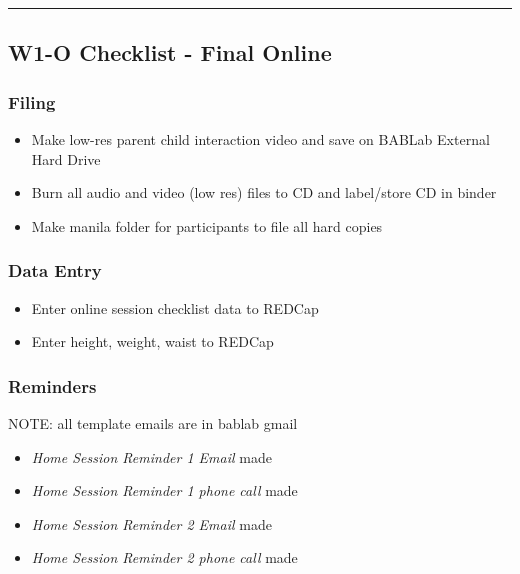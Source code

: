 \documentclass[
]{book}
\providecommand{\tightlist}{%
  \setlength{\itemsep}{0pt}\setlength{\parskip}{0pt}}
\begin{document}
\begin{center}\rule{0.5\linewidth}{0.5pt}\end{center}

\hypertarget{w1-o-checklist---final-online}{%
\subsection{W1-O Checklist - Final Online}\label{w1-o-checklist---final-online}}

\hypertarget{filing-3}{%
\subsubsection{Filing}\label{filing-3}}

\begin{itemize}
\tightlist
\item
  Make low-res parent child interaction video and save on BABLab External Hard Drive
\item
  Burn all audio and video (low res) files to CD and label/store CD in binder
\item
  Make manila folder for participants to file all hard copies
\end{itemize}

\hypertarget{data-entry-1}{%
\subsubsection{Data Entry}\label{data-entry-1}}

\begin{itemize}
\tightlist
\item
  Enter online session checklist data to REDCap
\item
  Enter height, weight, waist to REDCap
\end{itemize}

\hypertarget{reminders-2}{%
\subsubsection{Reminders}\label{reminders-2}}

NOTE: all template emails are in bablab gmail

\begin{itemize}
\tightlist
\item
  \emph{Home Session Reminder 1 Email} made
\item
  \emph{Home Session Reminder 1 phone call} made
\item
  \emph{Home Session Reminder 2 Email} made
\item
  \emph{Home Session Reminder 2 phone call} made
\end{itemize}
\end{document}
